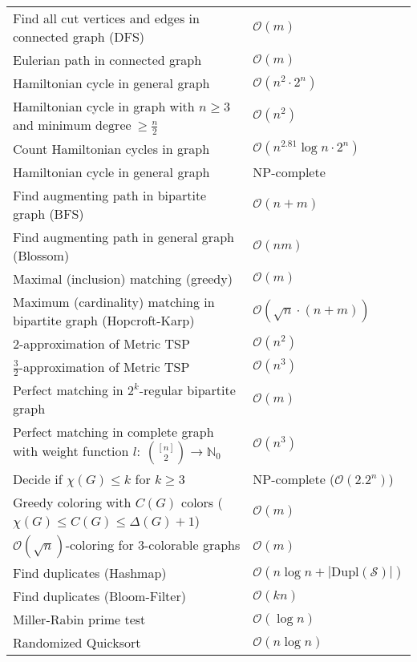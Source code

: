 \documentclass[a4paper,10pt]{article}
\newcommand{\bigO}{\mathcal{O}}
\begin{document}
    \begin{center}
    \begin{tabularx}{\textwidth}{Xl}
        \toprule
        Find all cut vertices and edges in connected graph (DFS) & \(\bigO(m)\) \\
        Eulerian path in connected graph & \(\bigO(m)\) \\
        Hamiltonian cycle in general graph & \(\bigO(n^2 \cdot 2^n)\) \\
        Hamiltonian cycle in graph with $n \geq 3$ and $\text{minimum degree} \ \geq \frac{n}{2}$ & \(\bigO(n^2)\) \\
        Count Hamiltonian cycles in graph & \(\bigO(n^{2.81} \log n \cdot 2^n)\) \\
        Hamiltonian cycle in general graph & NP-complete \\
        Find augmenting path in bipartite graph (BFS) & \(\bigO(n + m)\) \\
        Find augmenting path in general graph (Blossom) & \(\bigO(nm)\) \\
        Maximal (inclusion) matching (greedy) & \(\bigO(m)\) \\
        Maximum (cardinality) matching in bipartite graph (Hopcroft-Karp) & \(\bigO(\sqrt{n} \cdot (n+m))\) \\
        2-approximation of Metric TSP & \(\bigO(n^2)\) \\
        $\frac{3}{2}$-approximation of Metric TSP & \(\bigO(n^3)\) \\
        Perfect matching in \(2^k\)-regular bipartite graph & \(\bigO(m)\) \\
        Perfect matching in complete graph with weight function $l: \: \binom{[n]}{2} \to \mathbb{N}_0$ & \(\bigO(n^3)\) \\
        Decide if $\chi(G) \leq k$ for $k \geq 3$ & NP-complete ($\bigO(2.2^n)$) \\
        Greedy coloring with $C(G)$ colors ($\chi(G) \leq C(G) \leq \Delta(G) + 1$) & \(\bigO(m)\) \\
        \(\bigO(\sqrt{n})\)-coloring for 3-colorable graphs & \(\bigO(m)\) \\
        Find duplicates (Hashmap) & \(\bigO(n \log n + |\text{Dupl}(\mathcal{S})|)\) \\
        Find duplicates (Bloom-Filter) & \(\bigO(kn)\) \\
        Miller-Rabin prime test & \(\bigO(\log n)\) \\
        Randomized Quicksort & \(\bigO(n \log n)\)\footnotemark \\

\end{tabularx}
\end{center}
\end{document}
